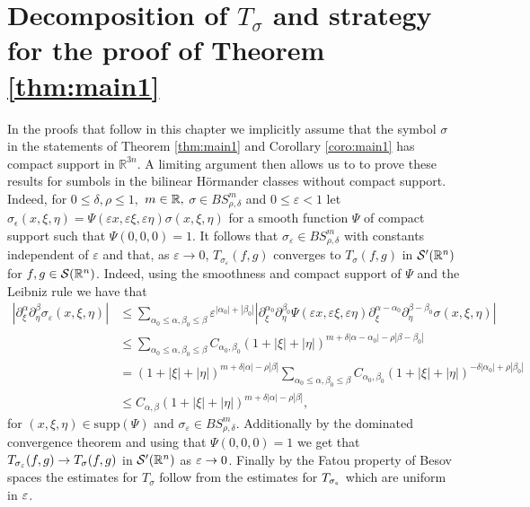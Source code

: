 \section{Decomposition of $T_\sigma$ and strategy for the proof of Theorem \ref{thm:main1}}\label{sec:decomp}
In the proofs that follow in this chapter we implicitly assume that the symbol $\sigma$ in the statements of Theorem \ref{thm:main1} and Corollary \ref{coro:main1} has compact support in $\mathbb{R}^{3n}$. A limiting argument then allows us to to prove these results for sumbols in the bilinear H\"ormander classes without compact support. Indeed, for $0\le \delta,\rho\le 1,$ $m\in\mathbb{R},$ $\sigma\in BS^m_{\rho,\delta}$ and $0\le \varepsilon<1$ let $\sigma_\epsilon (x,\xi,\eta) = \Psi(\varepsilon x, \varepsilon \xi, \varepsilon \eta) \sigma( x, \xi,\eta)$ for a smooth  function $\Psi$ of compact support such that $\Psi(0,0,0) = 1$. It follows that $\sigma_\varepsilon \in BS^m_{\rho,\delta}$ with constants independent of $\varepsilon$ and that, as $\varepsilon \rightarrow 0$, $T_{\sigma_\varepsilon}(f,g)$ converges to $T_\sigma(f,g)$ in ${\mathcal{S}'}({{\mathbb R}^n})$ for $f,g \in {\mathcal{S}}({{\mathbb R}^n})$. Indeed, using the smoothness and compact support of $\Psi$ and the Leibniz rule we have that 
\begin{align*}
|\partial^\alpha_\xi \partial^\beta_\eta \sigma_\varepsilon(x,\xi,\eta)| & 
\leq \sum_{\alpha_0 \leq \alpha, \beta_0 \leq \beta} \varepsilon^{|\alpha_0| + |\beta_0|}|\partial^{\alpha_0}_\xi \partial^{\beta_0}_\eta \Psi(\varepsilon x, \varepsilon \xi, \varepsilon \eta) \partial^{\alpha - \alpha_0}_\xi \partial^{\beta - \beta_0}_\eta \sigma(x,\xi,\eta) | \\
& \leq \sum_{\alpha_0 \leq \alpha, \beta_0 \leq \beta} C_{\alpha_0 , \beta_0} (1 + |\xi| + |\eta|)^{m + \delta|\alpha - \alpha_0| - \rho|\beta - \beta_0|} \\
& =(1 + |\xi| + |\eta|)^{m + \delta|\alpha| - \rho|\beta|} \sum_{\alpha_0 \leq \alpha, \beta_0 \leq \beta} C_{\alpha_0 , \beta_0} (1 + |\xi| + |\eta|)^{-\delta| \alpha_0| + \rho|\beta_0|} \\
& \leq C_{\alpha,\beta} (1 + |\xi| + |\eta|)^{m + \delta|\alpha| - \rho|\beta|},
\end{align*}
for $(x,\xi,\eta) \in \text{supp}(\Psi)$ and $\sigma_\varepsilon \in BS^m_{\rho,\delta}$. Additionally by the dominated convergence theorem and using that  $\Psi(0,0,0) = 1$ we get that $T_{\sigma_\varepsilon}(f,g) \rightarrow T_\sigma(f,g)$ in ${\mathcal{S}'}({{\mathbb R}^n})$ as $\varepsilon \rightarrow 0$. Finally by the Fatou property of Besov spaces the estimates for $T_\sigma$ follow from the estimates for $T_{\sigma_\varepsilon}$ which are uniform in $\varepsilon$. 


